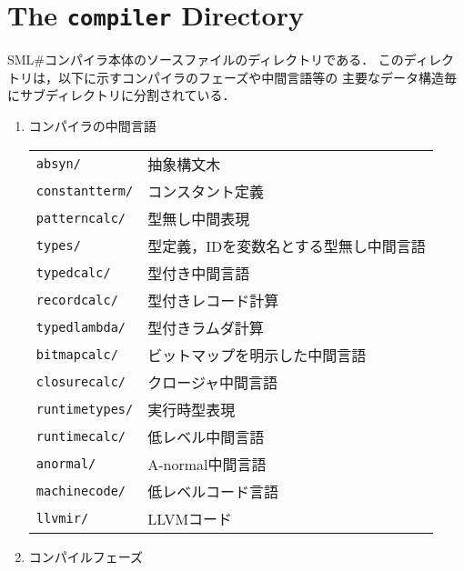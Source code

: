 \documentclass{jbook}
\newif\ifjp
\newcommand{\txt}[2]{#2}
\newcommand{\smlsharp}{SML\#}
\newcommand{\code}[1]{\mbox{\large\tt #1}}
\begin{document}
\section{\txt{\code{compiler}ディレクトリ}{The \code{compiler} Directory}}
\ifjp%
	\smlsharp{}コンパイラ本体のソースファイルのディレクトリである．
	このディレクトリは，以下に示すコンパイラのフェーズや中間言語等の
主要なデータ構造毎にサブディレクトリに分割されている．
\begin{enumerate}
\item 
	コンパイラの中間言語

\begin{tabular}{ll}
\code{absyn/}& 抽象構文木
\\
\code{constantterm/}& コンスタント定義
\\
\code{patterncalc/}& 型無し中間表現
\\
\code{types/}& 型定義，IDを変数名とする型無し中間言語
\\
\code{typedcalc/}& 型付き中間言語
\\
\code{recordcalc/}& 型付きレコード計算
\\
\code{typedlambda/}& 型付きラムダ計算
\\
\code{bitmapcalc/}& ビットマップを明示した中間言語
\\
\code{closurecalc/}& クロージャ中間言語
\\
\code{runtimetypes/}& 実行時型表現
\\
\code{runtimecalc/}& 低レベル中間言語
\\
\code{anormal/}& A-normal中間言語
\\
\code{machinecode/}& 低レベルコード言語
\\
\code{llvmir/}& LLVMコード
\end{tabular}

\item コンパイルフェーズ 


\end{enumerate}
\end{document}
